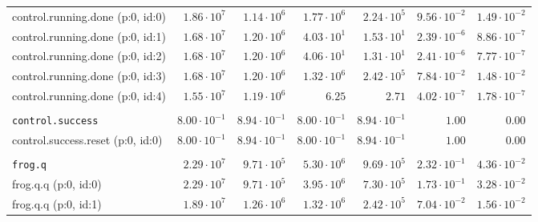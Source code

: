 \begin{table}[htbp]
{\begin{tabular}{lrrrrrr}
\hspace{3mm}control.running.done (p:0, id:0)  &  $1.86 \cdot 10^{7}$ &  $1.14 \cdot 10^{6}$ &  $1.77 \cdot 10^{6}$ &  $2.24 \cdot 10^{5}$ & $9.56 \cdot 10^{-2}$ & $1.49 \cdot 10^{-2}$ \\
\hspace{3mm}control.running.done (p:0, id:1)  &  $1.68 \cdot 10^{7}$ &  $1.20 \cdot 10^{6}$ &  $4.03 \cdot 10^{1}$ &  $1.53 \cdot 10^{1}$ & $2.39 \cdot 10^{-6}$ & $8.86 \cdot 10^{-7}$ \\
\hspace{3mm}control.running.done (p:0, id:2)  &  $1.68 \cdot 10^{7}$ &  $1.20 \cdot 10^{6}$ &  $4.06 \cdot 10^{1}$ &  $1.31 \cdot 10^{1}$ & $2.41 \cdot 10^{-6}$ & $7.77 \cdot 10^{-7}$ \\
\hspace{3mm}control.running.done (p:0, id:3)  &  $1.68 \cdot 10^{7}$ &  $1.20 \cdot 10^{6}$ &  $1.32 \cdot 10^{6}$ &  $2.42 \cdot 10^{5}$ & $7.84 \cdot 10^{-2}$ & $1.48 \cdot 10^{-2}$ \\
\hspace{3mm}control.running.done (p:0, id:4)  &  $1.55 \cdot 10^{7}$ &  $1.19 \cdot 10^{6}$ &               $6.25$ &               $2.71$ & $4.02 \cdot 10^{-7}$ & $1.78 \cdot 10^{-7}$ \\
\\[-8pt]\texttt{control.success}              & $8.00 \cdot 10^{-1}$ & $8.94 \cdot 10^{-1}$ & $8.00 \cdot 10^{-1}$ & $8.94 \cdot 10^{-1}$ &               $1.00$ &               $0.00$ \\
\hspace{3mm}control.success.reset (p:0, id:0) & $8.00 \cdot 10^{-1}$ & $8.94 \cdot 10^{-1}$ & $8.00 \cdot 10^{-1}$ & $8.94 \cdot 10^{-1}$ &               $1.00$ &               $0.00$ \\
\\[-8pt]\texttt{frog.q}                       &  $2.29 \cdot 10^{7}$ &  $9.71 \cdot 10^{5}$ &  $5.30 \cdot 10^{6}$ &  $9.69 \cdot 10^{5}$ & $2.32 \cdot 10^{-1}$ & $4.36 \cdot 10^{-2}$ \\
\hspace{3mm}frog.q.q (p:0, id:0)              &  $2.29 \cdot 10^{7}$ &  $9.71 \cdot 10^{5}$ &  $3.95 \cdot 10^{6}$ &  $7.30 \cdot 10^{5}$ & $1.73 \cdot 10^{-1}$ & $3.28 \cdot 10^{-2}$ \\
\hspace{3mm}frog.q.q (p:0, id:1)              &  $1.89 \cdot 10^{7}$ &  $1.26 \cdot 10^{6}$ &  $1.32 \cdot 10^{6}$ &  $2.42 \cdot 10^{5}$ & $7.04 \cdot 10^{-2}$ & $1.56 \cdot 10^{-2}$ \\

\end{tabular}}
\end{table}
